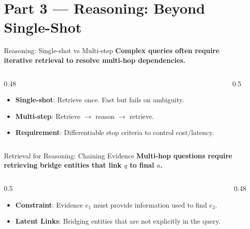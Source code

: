 \documentclass[aspectratio=169, xcolor=table]{beamer}
\begin{document}
\section{Part 3 --- Reasoning: Beyond Single-Shot}

\begin{frame}[plain]
\sectionpage
\end{frame}

\begin{frame}{Reasoning: Single-shot vs Multi-step}
\textbf{Complex queries often require iterative retrieval to resolve multi-hop dependencies.}

\vspace{0.5em}
\begin{columns}[T]
\begin{column}{0.48\textwidth}
\begin{itemize}
    \item \textbf{Single-shot}: Retrieve once. Fast but fails on ambiguity.
    \item \textbf{Multi-step}: Retrieve $\rightarrow$ reason $\rightarrow$ retrieve.
    \item \textbf{Requirement}: Differentiable stop criteria to control cost/latency.
\end{itemize}
\end{column}
\begin{column}{0.5\textwidth}
\begin{center}
\resizebox{\textwidth}{!}{

}
\end{center}
\end{column}
\end{columns}
\end{frame}

\begin{frame}{Retrieval for Reasoning: Chaining Evidence}
\textbf{Multi-hop questions require retrieving bridge entities that link $q$ to final $a$.}

\vspace{0.8em}
\begin{columns}[T]
\begin{column}{0.5\textwidth}
\begin{itemize}
    \item \textbf{Constraint}: Evidence $e_1$ must provide information used to find $e_2$.
    \item \textbf{Latent Links}: Bridging entities that are not explicitly in the query.
\end{itemize}
\end{column}
\begin{column}{0.48\textwidth}
\begin{center}
\resizebox{\textwidth}{!}{

}
\end{center}
\end{column}
\end{columns}
\end{frame}
\end{document}
